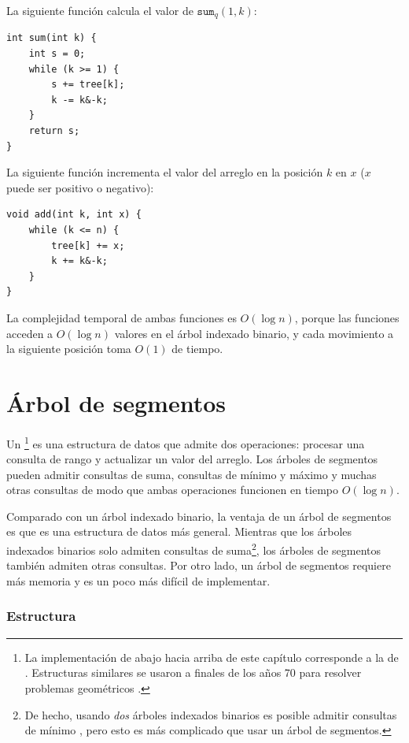 La siguiente función calcula el valor de $\texttt{sum}_q(1,k)$:
\begin{lstlisting}
int sum(int k) {
    int s = 0;
    while (k >= 1) {
        s += tree[k];
        k -= k&-k;
    }
    return s;
}
\end{lstlisting}

La siguiente función incrementa el
valor del arreglo en la posición $k$ en $x$
($x$ puede ser positivo o negativo):
\begin{lstlisting}
void add(int k, int x) {
    while (k <= n) {
        tree[k] += x;
        k += k&-k;
    }
}
\end{lstlisting}

La complejidad temporal de ambas funciones es
$O(\log n)$, porque las funciones acceden a $O(\log n)$
valores en el árbol indexado binario, y cada movimiento
a la siguiente posición toma $O(1)$ de tiempo.

\section{Árbol de segmentos}


Un \footnote{La implementación de abajo hacia arriba de este capítulo corresponde a
la de \cite{sta06}. Estructuras similares se usaron
a finales de los años 70 para resolver problemas geométricos \cite{ben80}.} es una estructura de datos
que admite dos operaciones:
procesar una consulta de rango y
actualizar un valor del arreglo.
Los árboles de segmentos pueden admitir
consultas de suma, consultas de mínimo y máximo y muchas otras
consultas de modo que ambas operaciones funcionen en tiempo $O(\log n)$.

Comparado con un árbol indexado binario,
la ventaja de un árbol de segmentos es que es
una estructura de datos más general.
Mientras que los árboles indexados binarios solo admiten
consultas de suma\footnote{De hecho, usando \emph{dos} árboles
indexados binarios es posible admitir consultas de mínimo \cite{dim15},
pero esto es más complicado que usar un árbol de segmentos.},
los árboles de segmentos también admiten otras consultas.
Por otro lado, un árbol de segmentos requiere más
memoria y es un poco más difícil de implementar.

\subsubsection{Estructura}

